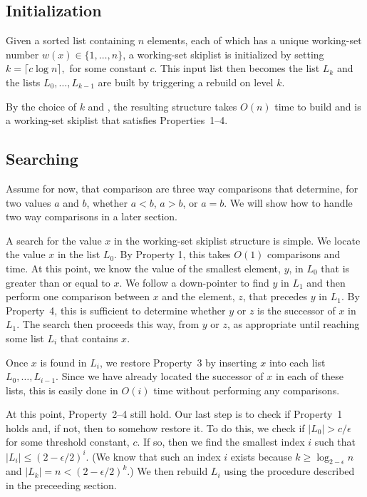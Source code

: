 \documentclass[lotsofwhite]{patmorin}
\begin{document}
\subsection{Initialization}

Given a sorted list containing $n$ elements, each of which has a
unique working-set number $w(x)\in\{1,\ldots,n\}$, a working-set
skiplist is initialized by setting $k=\lceil c \log n\rceil,$ for some
constant $c$. This input list then becomes the list $L_k$ and the lists
$L_0,\ldots,L_{k-1}$ are built by triggering a rebuild on level $k$.

By the choice of $k$ and , the resulting structure
takes $O(n)$ time to build and is a working-set skiplist that satisfies
Properties~1--4.

\subsection{Searching}

Assume for now, that comparison are three way comparisons that determine,
for two values $a$ and $b$, whether $a< b$, $a>b$, or $a=b$. We will
show how to handle two way comparisons in a later section.

A search for the value $x$ in the working-set skiplist structure is
simple.  We locate the value $x$ in the list $L_0$. By Property 1, this
takes $O(1)$ comparisons and time.  At this point, we know the value of
the smallest element, $y$, in $L_0$ that is greater than or equal to $x$.
We follow a down-pointer to find $y$ in $L_1$ and then perform one
comparison between $x$ and the element, $z$, that precedes $y$ in $L_1$.
By Property~4, this is sufficient to determine whether $y$ or $z$ is the
successor of $x$ in $L_1$.  The search then proceeds this way, from $y$
or $z$, as appropriate until reaching some list $L_i$ that contains $x$.

Once $x$ is found in $L_i$, we restore Property~3 by inserting $x$
into each list $L_0,\ldots,L_{i-1}$.  Since we have already located the
successor of $x$ in each of these lists, this is easily done in $O(i)$
time without performing any comparisons.  

At this point, Property~2--4 still hold.  Our last step is to check if
Property~1 holds and, if not, then to somehow restore it. To do this,
we check if $|L_0|> c/\epsilon$ for some threshold constant, $c$. If so,
then we find the smallest index $i$ such that $|L_i|\le (2-\epsilon/2)^i$.
(We know that such an index $i$ exists because $k\ge \log_{2-\epsilon}
n$ and $|L_k|=n < (2-\epsilon/2)^k$.)  We then rebuild $L_i$ using the
procedure described in the preceeding section.
\end{document}
